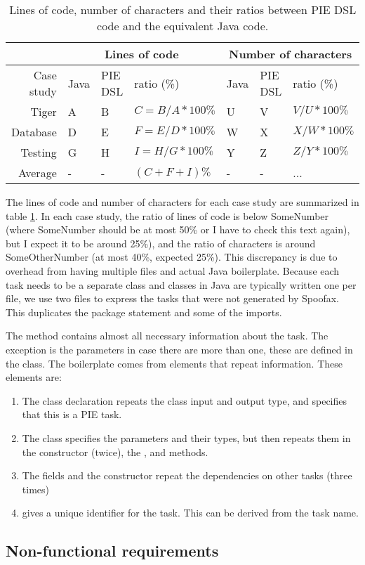 \begin{table}
  \caption{Lines of code, number of characters and their ratios between \ac{PIE} \ac{DSL} code and the equivalent Java code.}
  \label{tbl:evaluation_analysis_loc}
  \begin{tabular}{|r||l|l|l||l|l|l|}
    \hline
    & \multicolumn{3}{|c||}{Lines of code} & \multicolumn{3}{|c|}{Number of characters} \\
    \hline
    Case study & Java & \ac{PIE} \ac{DSL} & ratio (\%) & Java & \ac{PIE} \ac{DSL} & ratio (\%) \\
    \hline
    \hline
    Tiger & A & B & $C = B / A * 100\%$ & U & V & $V / U * 100\%$ \\
    Database & D & E & $F = E / D * 100\%$ & W & X & $X / W * 100\%$ \\
    Testing & G & H & $I = H / G * 100\%$ & Y & Z & $Z / Y * 100\%$ \\
    \hline
    Average & - & - & $(C + F + I)\%$ & - & - & ... \\
    \hline
  \end{tabular}
\end{table}

The lines of code and number of characters for each case study are summarized in table \ref{tbl:evaluation_analysis_loc}.
In each case study, the ratio of lines of code is below SomeNumber (where SomeNumber should be at most 50\% or I have to check this text again), but I expect it to be around 25\%), and the ratio of characters is around SomeOtherNumber (at most 40\%, expected 25\%).
This discrepancy is due to overhead from having multiple files and actual Java boilerplate.
Because each task needs to be a separate class and classes in Java are typically written one per file, we use two files to express the tasks that were not generated by Spoofax.
This duplicates the package statement and some of the imports.

The  method contains almost all necessary information about the task.
The exception is the parameters in case there are more than one, these are defined in the  class.
The boilerplate comes from elements that repeat information. These elements are:
\begin{enumerate}
  \item The class declaration repeats the class input and output type, and specifies that this is a \ac{PIE} task.
  \item The  class specifies the parameters and their types, but then repeats them in the constructor (twice), the ,  and  methods.
  \item The fields and the constructor repeat the dependencies on other tasks (three times)
  \item {} gives a unique identifier for the task.
  This can be derived from the task name.
\end{enumerate}

\subsection{Non-functional requirements}
\label{subsec:evaluation__analysis__non_functional_requirements}

